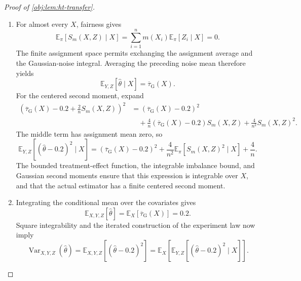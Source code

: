 \documentclass[11pt]{article}
\begin{document}
\begin{proof}[Proof of \cref{obj:lem:ht-transfer}]
\begin{enumerate}
\item
For almost every \(X\), fairness gives
\[
\mathbb E_\pi[S_m(X,Z)\mid X]
=
\sum_{i=1}^n m(X_i)\mathbb E_\pi[Z_i\mid X]
=
0.
\]
The finite assignment space permits exchanging the assignment average and the Gaussian-noise integral. Averaging the preceding noise mean therefore yields
\[
\mathbb E_{Y,Z}[\widehat\theta\mid X]
=
\overline\tau_{\mathrm G}(X).
\]
For the centered second moment, expand
\[
\begin{aligned}
\left(
\overline\tau_{\mathrm G}(X)-0.2+\frac2n S_m(X,Z)
\right)^2
&=
(\overline\tau_{\mathrm G}(X)-0.2)^2\\
&\quad+
\frac4n(\overline\tau_{\mathrm G}(X)-0.2)S_m(X,Z)
+\frac4{n^2}S_m(X,Z)^2.
\end{aligned}
\]
The middle term has assignment mean zero, so
\[
\mathbb E_{Y,Z}[(\widehat\theta-0.2)^2\mid X]
=
(\overline\tau_{\mathrm G}(X)-0.2)^2
+\frac4{n^2}\mathbb E_\pi[S_m(X,Z)^2\mid X]
+\frac4n.
\]
The bounded treatment-effect function, the integrable imbalance bound, and Gaussian second moments ensure that this expression is integrable over \(X\), and that the actual estimator has a finite centered second moment. %

\item
Integrating the conditional mean over the covariates gives
\[
\mathbb E_{X,Y,Z}[\widehat\theta]
=
\mathbb E_X[\overline\tau_{\mathrm G}(X)]
=
0.2.
\]
Square integrability and the iterated construction of the experiment law now imply
\[
\operatorname{Var}_{X,Y,Z}(\widehat\theta)
=
\mathbb E_{X,Y,Z}[(\widehat\theta-0.2)^2]
=
\mathbb E_X\!\left[
\mathbb E_{Y,Z}[(\widehat\theta-0.2)^2\mid X]
\right].
\]


\end{enumerate}
\end{proof}
\end{document}
